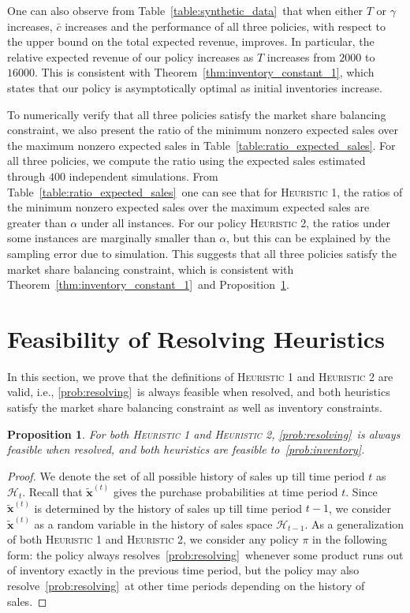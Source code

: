 \documentclass[mnsc,non-blindrev]{informs3}
\newtheorem{proposition}[theorem]{Proposition}
\theoremstyle{definition}
\begin{document}
\begin{appendices}{\Large{}}
{One can also observe from Table~\ref{table:synthetic_data}~that when either $T$ or $\gamma$ increases, $\bar{c}$ increases and the performance of all three policies, with respect to the upper bound on the total expected revenue, improves. In particular, the relative expected revenue of our policy increases as $T$ increases from $2000$ to $16000$. This is consistent with Theorem~\ref{thm:inventory_constant_1}, which states that our policy is asymptotically optimal as initial inventories increase.

To numerically verify that all three policies satisfy the market share balancing constraint, we also present the ratio of the minimum nonzero expected sales over the maximum nonzero expected sales in Table~\ref{table:ratio_expected_sales}. For all three policies, we compute the ratio using the expected sales estimated through $400$ independent simulations. From Table~\ref{table:ratio_expected_sales}~one can see that for \textsc{Heuristic 1}, the ratios of the minimum nonzero expected sales over the maximum expected sales are greater than $\alpha$ under all instances. For our policy \textsc{Heuristic 2}, the ratios under some instances are marginally smaller than $\alpha$, but this can be explained by the sampling error due to simulation. This suggests that all three policies satisfy the market share balancing constraint, which is consistent with Theorem~\ref{thm:inventory_constant_1}~and Proposition~\ref{prop:heuristic}.}

\section{Feasibility of Resolving Heuristics}\label{sec:prop:heuristic}

In this section, we prove that the definitions of \textsc{Heuristic 1} and \textsc{Heuristic 2} are valid, i.e., \ref{prob:resolving}~is always feasible when resolved, and both heuristics satisfy the market share balancing constraint as well as inventory constraints. 

\begin{proposition}\label{prop:heuristic}
For both \textsc{Heuristic 1} and \textsc{Heuristic 2}, \ref{prob:resolving}~is always feasible when resolved, and both heuristics are feasible to~\ref{prob:inventory}.
\end{proposition}

\begin{proof}
We denote the set of all possible history of sales up till time period $t$ as $\mathcal{H}_t$. Recall that $\tilde{\bm{x}}^{(t)}$ gives the purchase probabilities at time period $t$. Since $\tilde{\bm{x}}^{(t)}$ is determined by the history of sales up till time period $t-1$, we consider $\tilde{\bm{x}}^{(t)}$ as a random variable in the history of sales space $\mathcal{H}_{t-1}$. As a generalization of both \textsc{Heuristic 1} and \textsc{Heuristic 2}, we consider any policy $\pi$ in the following form: the policy always resolves~\ref{prob:resolving}~whenever some product runs out of inventory exactly in the previous time period, but the policy may also resolve~\ref{prob:resolving}~at other time periods depending on the history of sales.


\end{proof}
\end{appendices}
\end{document}
